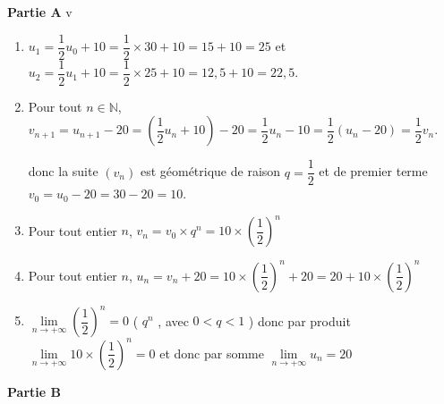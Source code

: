 \medskip

\textbf{Partie A}
v
 \begin{enumerate}
    \item $ u_1 = \dfrac{1}{2}u_0 + 10= \dfrac{1}{2} \times 30 + 10 = 15 + 10 = 25$ et $ u_2 = \dfrac{1}{2}u_1 + 10=  \dfrac{1}{2} \times 25 + 10 = 12,5 + 10 = 22,5.$

    \item Pour tout \( n \in \mathbb{N} \), $v_{n+1} = u_{n+1} - 20 = \left( \dfrac{1}{2}u_n + 10 \right) - 20 = \dfrac{1}{2}u_n - 10 = \dfrac{1}{2} \left( u_n - 20\right) = \dfrac{1}{2}v_n$.


donc la suite \( (v_n) \) est géométrique de raison \( q=\dfrac{1}{2} \) et de premier terme $v_0=u_0-20=30-20=10$.

    \item Pour tout entier $n$, $v_n=v_0 \times q^n =   10 \times \left( \dfrac{1}{2} \right)^n$

    \item Pour tout entier $n$,  $u_n = v_n + 20 = 10 \times \left( \dfrac{1}{2} \right)^n + 20 = 20 + 10 \times \left( \dfrac{1}{2} \right)^n$

    \item $\lim\limits_{n \to +\infty} \left( \dfrac{1}{2} \right)^n=0$ ( $q^n$ , avec $0<q<1$ ) donc par produit $\lim\limits_{n \to +\infty}  10 \times\left( \dfrac{1}{2} \right)^n=0$ et donc par somme  $\lim\limits_{n \to +\infty} u_n=20$ 
 
\end{enumerate}

\textbf{Partie B}
 
